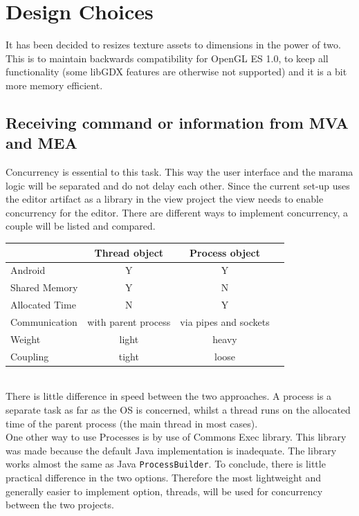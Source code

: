 \documentclass[10pt]{extarticle} %
\begin{document}
    \newpage

    \section{Design Choices}
    \label{sec:designchoices}
    It has been decided to resizes texture assets to dimensions in the power of two.
    This is to maintain backwards compatibility for OpenGL ES 1.0, to keep all functionality (some libGDX features are otherwise not supported) and it is a bit more memory efficient.\cite{libgdxpottex}

    \subsection[Communication MVA-MEA]{Receiving command or information from MVA and MEA}
    \label{subsec:comchoice}
    Concurrency is essential to this task.
    This way the user interface and the marama logic will be separated and do not delay each other.
    Since the current set-up uses the editor artifact as a library in the view project the view needs to enable concurrency for the editor.
    There are different ways to implement concurrency, a couple will be listed and compared.\\
    \begin{tabular}[c]{| l || c | c | c}
        \hline
        & Thread object & Process object\\\cline{2-3}\hline
        Android & Y & Y \\
        Shared Memory\cite{vogeljavaconc,noobbookjavaconc} & Y & N \\
        Allocated Time\cite{vogeljavaconc} & N & Y \\
        Communication\cite{noobbookjavaconc} & with parent process & via pipes and sockets \\
        Weight\cite{noobbookjavaconc,stackjavaconc,develjavaconc} & light & heavy \\
        Coupling\cite{stackjavaconc} & tight & loose \\
        \hline
    \end{tabular}\\
    There is little difference in speed\cite{stackjavaconc} between the two approaches.
    A process is a separate task as far as the OS is concerned, whilst a thread runs on the allocated time of the parent process (the main thread in most cases).\\
    One other way to use Processes is by use of Commons Exec\cite{commonsexec} library.
    This library was made because the default Java implementation is inadequate.
    The library works almost the same as Java \texttt{ProcessBuilder}.
    To conclude, there is little practical difference in the two options.
    Therefore the most lightweight and generally easier to implement option, threads, will be used for concurrency between the two projects.
\end{document}

